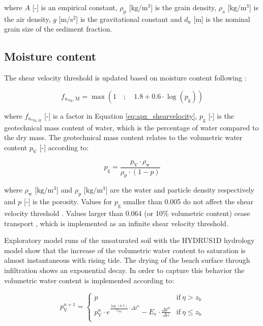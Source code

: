 \noindent where $A$ [-] is an empirical constant, $\rho_{\mathrm{p}}$
[$\mathrm{kg/m^3}$] is the grain density, $\rho_{\mathrm{a}}$
[$\mathrm{kg/m^3}$] is the air density, $g$ [$\mathrm{m/s^2}$] is the
gravitational constant and $d_{\mathrm{n}}$ [m] is the nominal grain
size of the sediment fraction.

\subsection{Moisture content}

The shear velocity threshold is updated based on moisture content
following \citet{Belly1964}:

\begin{equation}
  \label{eq:apx_moist}
  f_{u_{\mathrm{* th}}, \mathrm{M}} = \max(1 \quad ; \quad 1.8 + 0.6 \cdot \log(p_{\mathrm{g}}))
\end{equation}

\noindent where $f_{u_{\mathrm{* th},M}}$ [-] is a factor in Equation \ref{eq:apx_shearvelocity}, $p_{\mathrm{g}}$ [-] is the geotechnical
mass content of water, which is the percentage of water compared to
the dry mass. The geotechnical mass content relates to the volumetric
water content $p_{\mathrm{V}}$ [-] according to:

\begin{equation}
  p_{\mathrm{g}} = \frac{p_{\mathrm{V}} \cdot \rho_{\mathrm{w}}}{\rho_{\mathrm{p}} \cdot (1 - p)}
\end{equation}

\noindent where $\rho_{\mathrm{w}}$ [$\mathrm{kg/m^3}$] and
$\rho_{\mathrm{p}}$ [$\mathrm{kg/m^3}$] are the water and particle
density respectively and $p$ [-] is the porosity. Values for
$p_{\mathrm{g}}$ smaller than 0.005 do not affect the shear velocity
threshold \citep{Pye1990}. Values larger than 0.064 (or 10\%
volumetric content) cease transport \citep{DelgadoFernandez2010},
which is implemented as an infinite shear velocity threshold.

Exploratory model runs of the unsaturated soil with the HYDRUS1D
\citep{Simunek1998} hydrology model show that the increase of the
volumetric water content to saturation is almost instantaneous with
rising tide. The drying of the beach surface through infiltration
shows an exponential decay. In order to capture this behavior the
volumetric water content is implemented according to:

\begin{equation}
  \label{eq:apx_drying}
  p_{\mathrm{V}}^{n+1} = \left\{
    \begin{array}{ll}
      p & \mathrm{if} ~ \eta > z_{\mathrm{b}} \\
      p_{\mathrm{V}}^n \cdot e^{\frac{\log \left( 0.5 \right)}{T_{\mathrm{dry}}} \cdot \Delta t^n} - E_{\mathrm{v}} \cdot \frac{\Delta t^n}{\Delta z} & \mathrm{if} ~ \eta \leq z_{\mathrm{b}} \\
    \end{array}
  \right.
\end{equation}

